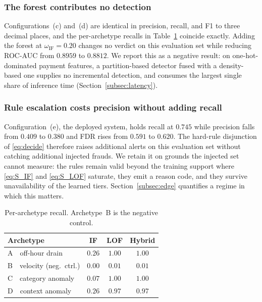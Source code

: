 \documentclass[conference]{IEEEtran}
\begin{document}
\subsubsection{The forest contributes no detection}
Configurations~(c) and~(d) are identical in precision, recall, and F1
to three decimal places, and the per-archetype recalls in
Table~\ref{tab:archetype_recall} coincide exactly. Adding the forest at
$\omega_{\mathrm{IF}}=0.20$ changes no verdict on this evaluation set
while reducing ROC-AUC from $0.8959$ to $0.8812$. We report this as a
negative result: on one-hot-dominated payment features, a
partition-based detector fused with a density-based one supplies no
incremental detection, and consumes the largest single share of
inference time (Section~\ref{subsec:latency}).

\subsubsection{Rule escalation costs precision without adding recall}
Configuration~(e), the deployed system, holds recall at $0.745$ while
precision falls from $0.409$ to $0.380$ and FDR rises from $0.591$ to
$0.620$. The hard-rule disjunction of \eqref{eq:decide} therefore
raises additional alerts on this evaluation set without catching
additional injected frauds. We retain it on grounds the injected set
cannot measure: the rules remain valid beyond the training support
where \eqref{eq:S_IF} and \eqref{eq:S_LOF} saturate, they emit a
reason code, and they survive unavailability of the learned tiers.
Section~\ref{subsec:edge} quantifies a regime in which this matters.

\begin{table}[t]
\centering
\caption{Per-archetype recall. Archetype~B is the negative control.}
\label{tab:archetype_recall}
\renewcommand{\arraystretch}{1.2}
\footnotesize
\begin{tabular}{@{}lccc@{}}
\toprule
\textbf{Archetype} & \textbf{IF} & \textbf{LOF} & \textbf{Hybrid} \\
\midrule
A~~off-hour drain          & $0.26$ & $1.00$ & $1.00$ \\
B~~velocity (neg.\ ctrl.)  & $0.00$ & $0.01$ & $0.01$ \\
C~~category anomaly        & $0.07$ & $1.00$ & $1.00$ \\
D~~context anomaly         & $0.26$ & $0.97$ & $0.97$ \\
\bottomrule
\end{tabular}
\end{table}
\end{document}
